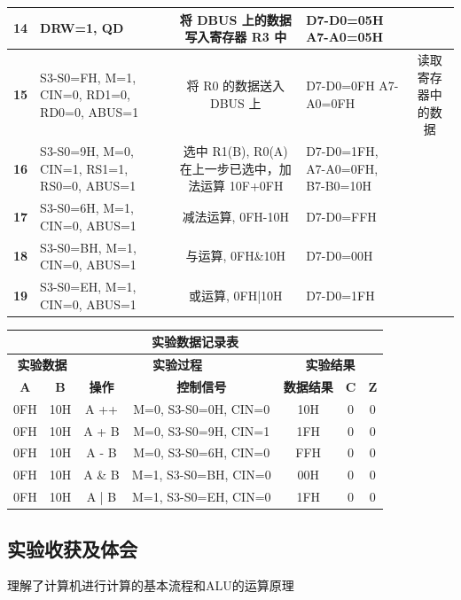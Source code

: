 \begin{table}[htbp]
{\begin{tabular}{|c|>{\centering\arraybackslash}p{4cm}|c|c|>{\centering\arraybackslash}p{3cm}|c|}
                    \textbf{14} & DRW=1, QD & & 将 DBUS 上的数据写入寄存器 R3 中 & D7-D0=05H A7-A0=05H & \\ \hline
                    \textbf{15} & S3-S0=FH, M=1, CIN=0, RD1=0, RD0=0, ABUS=1 & & 将 R0 的数据送入 DBUS 上 & D7-D0=0FH A7-A0=0FH & 读取寄存器中的数据 \\ \hline
                    \textbf{16} & S3-S0=9H, M=0, CIN=1, RS1=1, RS0=0, ABUS=1 & & 选中 R1(B), R0(A)在上一步已选中，加法运算 10F+0FH & D7-D0=1FH, A7-A0=0FH, B7-B0=10H & \\ \hline
                    \textbf{17} & S3-S0=6H, M=1, CIN=0, ABUS=1 & & 减法运算, 0FH-10H & D7-D0=FFH & \\ \hline
                    \textbf{18} & S3-S0=BH, M=1, CIN=0, ABUS=1 & & 与运算, 0FH\&10H & D7-D0=00H & \\ \hline
                    \textbf{19} & S3-S0=EH, M=1, CIN=0, ABUS=1 & & 或运算, 0FH|10H & D7-D0=1FH & \\ \hline
                \end{tabular}
                } 
            \end{table}
            \begin{table}[htbp]
                \centering
                \begin{tabular}{|c|c|c|c|c|c|c|}
                    \hline
                    \multicolumn{7}{|c|}{\textbf{实验数据记录表}} \\ \hline
                    \multicolumn{2}{|c|}{\textbf{实验数据}} & \multicolumn{2}{c}{\textbf{实验过程}} & \multicolumn{3}{|c|}{\textbf{实验结果}} \\ \hline
                    \textbf{A} & \textbf{B} & \textbf{操作} & \textbf{控制信号} & \textbf{数据结果} & \textbf{C} & \textbf{Z} \\ \hline
                    0FH & 10H & A ++ & M=0, S3-S0=0H, CIN=0 & 10H & 0 & 0 \\ \hline
                    0FH & 10H & A + B & M=0, S3-S0=9H, CIN=1 & 1FH & 0 & 0 \\ \hline
                    0FH & 10H & A - B & M=0, S3-S0=6H, CIN=0 & FFH & 0 & 0 \\ \hline
                    0FH & 10H & A \& B & M=1, S3-S0=BH, CIN=0 & 00H & 0 & 0 \\ \hline
                    0FH & 10H & A | B & M=1, S3-S0=EH, CIN=0 & 1FH & 0 & 0 \\ \hline
                \end{tabular}  
            \end{table}
    \subsection{实验收获及体会}
        \par 理解了计算机进行计算的基本流程和ALU的运算原理



